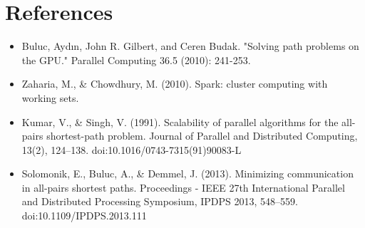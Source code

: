 \documentclass{article} %
\begin{document}
\section{References}
\begin{itemize}
\item Buluc, Aydın, John R. Gilbert, and Ceren Budak. "Solving path problems on the GPU." Parallel Computing 36.5 (2010): 241-253.
\item Zaharia, M., \& Chowdhury, M. (2010). Spark: cluster computing with working sets.
\item Kumar, V., \& Singh, V. (1991). Scalability of parallel algorithms for the all-pairs shortest-path problem. Journal of Parallel and Distributed Computing, 13(2), 124–138. doi:10.1016/0743-7315(91)90083-L
\item Solomonik, E., Buluc, A., \& Demmel, J. (2013). Minimizing communication in all-pairs shortest paths. Proceedings - IEEE 27th International Parallel and Distributed Processing Symposium, IPDPS 2013, 548–559. doi:10.1109/IPDPS.2013.111
\end{itemize}
\end{document}
